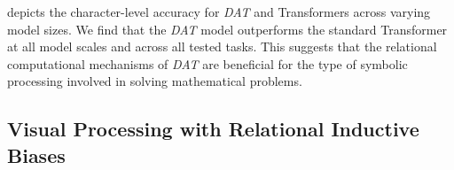  depicts the character-level accuracy for \textit{DAT} and Transformers across varying model sizes. We find that the \textit{DAT} model outperforms the standard Transformer at all model scales and across all tested tasks. This suggests that the relational computational mechanisms of \textit{DAT} are beneficial for the type of symbolic processing involved in solving mathematical problems.



%     



\subsection{Visual Processing with Relational Inductive Biases}\label{ssec:vision}

